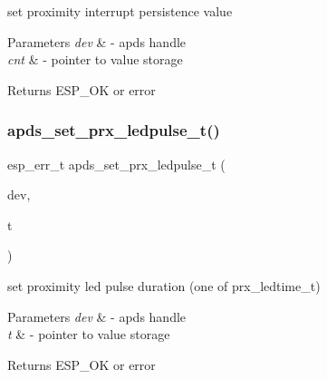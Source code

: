 \begin{DoxyItemize}
\item set proximity interrupt persistence value 
\end{DoxyItemize}


\begin{DoxyParams}{Parameters}
{\em dev} & -\/ apds handle \\
\hline
{\em cnt} & -\/ pointer to value storage \\
\hline
\end{DoxyParams}
\begin{DoxyReturn}{Returns}
E\+S\+P\+\_\+\+OK or error 
\end{DoxyReturn}
\mbox{\label{group__APDS9960__ProximityFunctions_ga112a924f037335d95b65e46e47882601}} 
\subsubsection{\texorpdfstring{apds\+\_\+set\+\_\+prx\+\_\+ledpulse\+\_\+t()}{apds\_set\_prx\_ledpulse\_t()}}
{\footnotesize\ttfamily esp\+\_\+err\+\_\+t apds\+\_\+set\+\_\+prx\+\_\+ledpulse\+\_\+t (\begin{DoxyParamCaption}\item[{\hyperlink{structAPDS9960__Driver}{A\+P\+D\+S\+\_\+\+D\+EV}}]{dev,  }\item[{prx\+\_\+ledtime\+\_\+t $\ast$}]{t }\end{DoxyParamCaption})}




\begin{DoxyItemize}
\item set proximity led pulse duration (one of prx\+\_\+ledtime\+\_\+t) 
\end{DoxyItemize}


\begin{DoxyParams}{Parameters}
{\em dev} & -\/ apds handle \\
\hline
{\em t} & -\/ pointer to value storage \\
\hline
\end{DoxyParams}
\begin{DoxyReturn}{Returns}
E\+S\+P\+\_\+\+OK or error 
\end{DoxyReturn}
\mbox{\label{group__APDS9960__ProximityFunctions_ga5b6df0f58c5eb5d26cc094c2f8284778}} 
